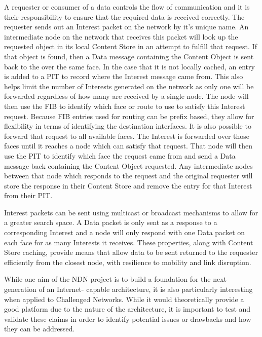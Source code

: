 \documentclass[a4paper,12pt]{report}      %
\begin{document}
A requester or consumer of a data controls the flow of communication and it is their responsibility to
ensure that the required data is received correctly. The requester sends out an Interest packet on the
network by it's unique name. An intermediate node on the network that receives this packet will look
up the requested object in its local Content Store in an attempt to fulfill that request. If that object is
found, then a Data message containing the Content Object is sent back to the over the same face. In the
case that it is not locally cached, an entry is added to a PIT to record where the Interest message came
from. This also helps limit the number of Interests generated on the network as only one will be
forwarded regardless of how many are received by a single node. The node will then use the FIB to
identify which face or route to use to satisfy this Interest request. Because FIB entries used for routing
can be prefix based, they allow for flexibility in terms of identifying the destination interfaces. It is also
possible to forward that request to all available faces. The Interest is forwarded over those faces until it
reaches a node which can satisfy that request. That node will then use the PIT to identify which face the
request came from and send a Data message back containing the Content Object requested. Any
intermediate nodes between that node which responds to the request and the original requester will
store the response in their Content Store and remove the entry for that Interest from their PIT. \cite{nnc}

Interest packets can be sent using multicast or broadcast mechanisms to allow for a greater search
space. A Data packet is only sent as a response to a corresponding Interest and a node will only respond
with one Data packet on each face for as many Interests it receives. These properties, along with
Content Store caching, provide means that allow data to be sent returned to the requester efficiently
from the closest node, with resilience to mobility and link disruption.

While one aim of the NDN project is to build a foundation for the next generation of an Internet-
capable architecture, it is also particularly interesting when applied to Challenged Networks. While it
would theoretically provide a good platform due to the nature of the architecture, it is important to test
and validate these claims in order to identify potential issues or drawbacks and how they can be
addressed. \cite{ndnproj}
\end{document}
